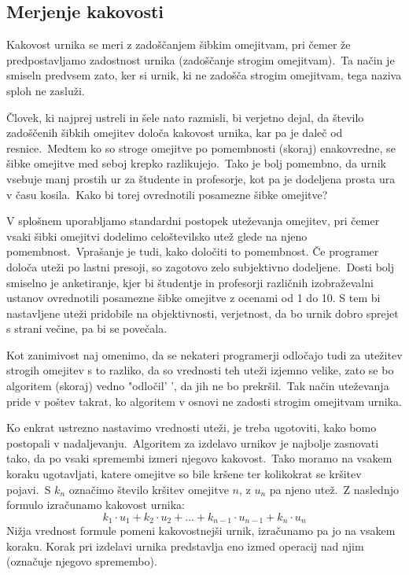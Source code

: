 \documentclass[a4paper,10pt]{article}
\begin{document}
\subsection{Merjenje kakovosti} %

Kakovost urnika se meri z zadoščanjem šibkim omejitvam, pri čemer že predpostavljamo
zadostnost urnika (zadoščanje strogim omejitvam).\ Ta način je smiseln predvsem zato,
ker si urnik, ki ne zadošča strogim omejitvam, tega naziva sploh ne zasluži.

Človek, ki najprej ustreli in šele nato razmisli, bi verjetno dejal, da število
zadoščenih šibkih omejitev določa kakovost urnika, kar pa je daleč od resnice.\ Medtem
ko so stroge omejitve po pomembnosti (skoraj) enakovredne, se šibke omejitve med seboj
krepko razlikujejo.\ Tako je bolj pomembno, da urnik vsebuje manj prostih ur za
študente in profesorje, kot pa je dodeljena prosta ura v času kosila.\ Kako bi torej
ovrednotili posamezne šibke omejitve?

V splošnem uporabljamo standardni postopek uteževanja omejitev, pri čemer vsaki šibki
omejitvi dodelimo celoštevilsko utež glede na njeno pomembnost.\ Vprašanje je tudi, kako
določiti to pomembnost. Če programer določa uteži po lastni presoji, so zagotovo zelo
subjektivno dodeljene.\ Dosti bolj smiselno je anketiranje, kjer bi študentje in profesorji
različnih izobraževalni ustanov ovrednotili posamezne šibke omejitve z ocenami od 1 do 10.
S tem bi nastavljene uteži pridobile na objektivnosti, verjetnost, da bo urnik dobro
sprejet s strani večine, pa bi se povečala.

Kot zanimivost naj omenimo, da se nekateri programerji odločajo tudi za utežitev strogih
omejitev s to razliko, da so vrednosti teh uteži izjemno velike, zato se bo algoritem
(skoraj) vedno "odločil' ', da jih ne bo prekršil.\ Tak način uteževanja pride v poštev
takrat, ko algoritem v osnovi ne zadosti strogim omejitvam urnika.

Ko enkrat ustrezno nastavimo vrednosti uteži, je treba ugotoviti, kako bomo postopali
v nadaljevanju.\ Algoritem za izdelavo urnikov je najbolje zasnovati tako, da po vsaki
spremembi izmeri njegovo kakovost.\ Tako moramo na vsakem koraku ugotavljati, katere
omejitve so bile kršene ter kolikokrat se kršitev pojavi.\ S $k_n$ označimo število
kršitev omejitve $n$, z $u_n$ pa njeno utež.\ Z naslednjo formulo izračunamo
kakovost urnika:
\[
k_1 \cdot u_1 + k_2 \cdot u_2 + \dots + k_{n-1}\cdot u_{n-1} + k_n \cdot u_n
\]
Nižja vrednost formule pomeni kakovostnejši urnik, izračunamo pa jo na vsakem koraku.
Korak pri izdelavi urnika predstavlja eno izmed operacij nad njim (označuje njegovo
spremembo).
\end{document}
